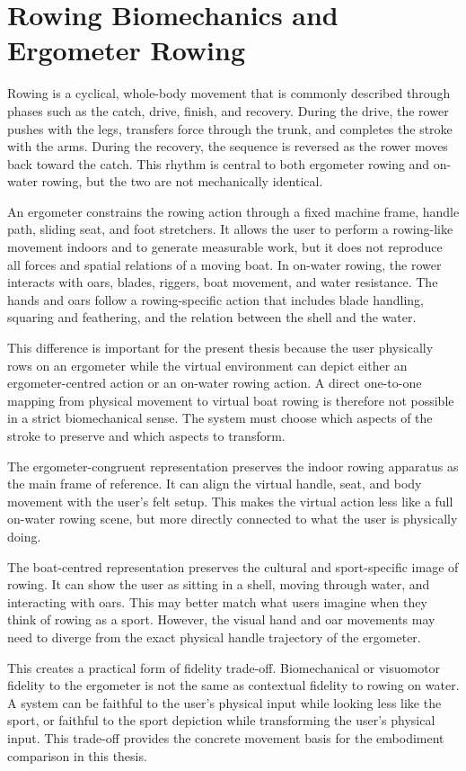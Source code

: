 \section{Rowing Biomechanics and Ergometer Rowing}
\label{sec:background_rowing_biomechanics_ergometer}

Rowing is a cyclical, whole-body movement that is commonly described through phases such as the catch, drive, finish, and recovery. During the drive, the rower pushes with the legs, transfers force through the trunk, and completes the stroke with the arms. During the recovery, the sequence is reversed as the rower moves back toward the catch. This rhythm is central to both ergometer rowing and on-water rowing, but the two are not mechanically identical.

An ergometer constrains the rowing action through a fixed machine frame, handle path, sliding seat, and foot stretchers. It allows the user to perform a rowing-like movement indoors and to generate measurable work, but it does not reproduce all forces and spatial relations of a moving boat. In on-water rowing, the rower interacts with oars, blades, riggers, boat movement, and water resistance. The hands and oars follow a rowing-specific action that includes blade handling, squaring and feathering, and the relation between the shell and the water.

This difference is important for the present thesis because the user physically rows on an ergometer while the virtual environment can depict either an ergometer-centred action or an on-water rowing action. A direct one-to-one mapping from physical movement to virtual boat rowing is therefore not possible in a strict biomechanical sense. The system must choose which aspects of the stroke to preserve and which aspects to transform.

The ergometer-congruent representation preserves the indoor rowing apparatus as the main frame of reference. It can align the virtual handle, seat, and body movement with the user's felt setup. This makes the virtual action less like a full on-water rowing scene, but more directly connected to what the user is physically doing.

The boat-centred representation preserves the cultural and sport-specific image of rowing. It can show the user as sitting in a shell, moving through water, and interacting with oars. This may better match what users imagine when they think of rowing as a sport. However, the visual hand and oar movements may need to diverge from the exact physical handle trajectory of the ergometer.

This creates a practical form of fidelity trade-off. Biomechanical or visuomotor fidelity to the ergometer is not the same as contextual fidelity to rowing on water. A system can be faithful to the user's physical input while looking less like the sport, or faithful to the sport depiction while transforming the user's physical input. This trade-off provides the concrete movement basis for the embodiment comparison in this thesis.
